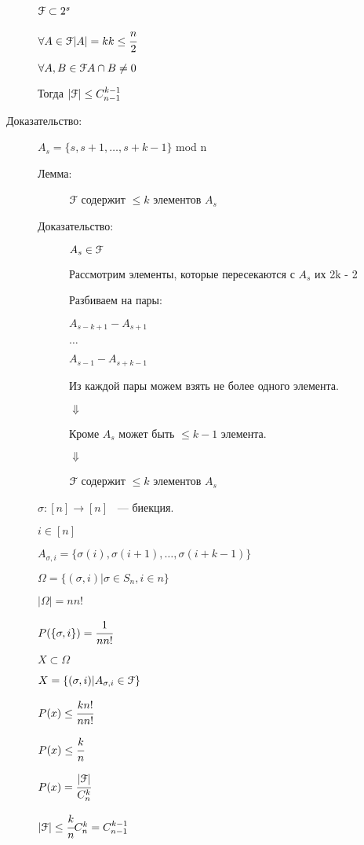 \documentclass[12pt]{article}
\begin{document}
\begin{description}
\begin{description}
$\EuScript F \subset 2^s$

$\forall A \in \EuScript F |A| = k k \le \cfrac{n}{2}$

$\forall A, B \in \EuScript F A \cap B \ne 0$

Тогда $|\EuScript F| \le C_{n-1}^{k - 1}$

\item[Доказательство:]

    $A_s = \{s, s  +1, \ldots, s+ k -1\}$ mod n 
    \begin{description}
    \item[Лемма:] $\EuScript F$ содержит $\le k$ элементов $A_s$
    \item[Доказательство:] $A_s \in \EuScript F$ 

      Рассмотрим элементы, которые пересекаются с $A_s$ их 2k - 2

      Разбиваем на пары:

     $A_{s - k +1}  - A_{s + 1}$

    $\ldots$

     $A_{s - 1}  - A_{s + k - 1}$   

     Из каждой пары можем взять не более одного элемента. 

    $\Downarrow$

    Кроме $A_s$ может быть $\le k - 1$ элемента.

   $\Downarrow$

   $\EuScript F$ содержит $\le k$ элементов $A_s$ 
    \end{description}
   $\sigma:[n]\to [n]$ ~--- биекция.
    
    $i \in [n]$

   $A_{\sigma, i} = \{\sigma (i), \sigma (i + 1), \ldots, \sigma (i + k - 1)\}$

    $\Omega = \{(\sigma ,i)| \sigma \in S_n, i \in n\}$
   
     $|\Omega| = n n!$

   $P(\{\sigma, i\}) = \cfrac{1}{n n!}$

     $X \subset \Omega$

      $X = \{(\sigma, i)|A_{\sigma, i} \in \EuScript F\}$

     
     $P(x)\le \cfrac{k n!}{n n!}$


     $P(x)\le \cfrac{k}{n}$

    $P(x) = \cfrac{|\EuScript F|}{C_n^k}$

      $|\EuScript F| \le \cfrac{k}{n}C_n^k = C_{n -1}^{k - 1}$
\end{description}


\end{description}
\end{document}
